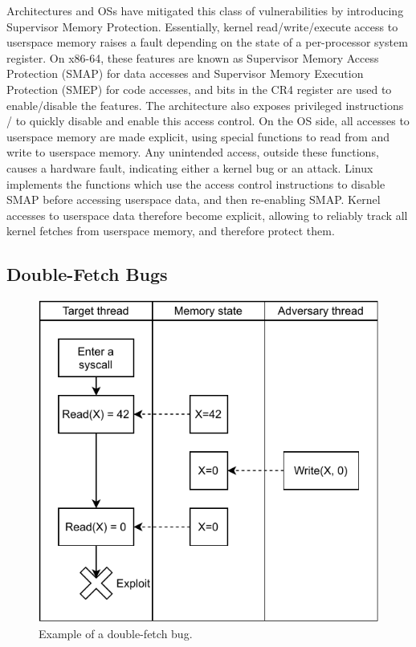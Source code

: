 \documentclass[letterpaper,twocolumn,10pt, anonymous]{article}
\begin{document}
Architectures and OSs have mitigated this class of vulnerabilities
by introducing Supervisor Memory Protection.
Essentially, kernel read/write/execute access to userspace memory
raises a fault depending on the state of a per-processor system 
register.
On x86-64, these features are known as Supervisor Memory Access 
Protection (SMAP) for data accesses and Supervisor Memory Execution 
Protection (SMEP) for code accesses, and bits in the CR4 register 
are used to enable/disable the features.
The architecture also exposes privileged instructions 
/ to quickly disable and enable this access 
control.
On the OS side, all accesses to userspace memory are made explicit, 
using special functions to read from and write to userspace memory.
Any unintended access, outside these functions, causes a 
hardware fault, indicating either a kernel bug or an attack.
Linux implements the functions  which 
use the access control instructions to disable SMAP before 
accessing userspace data, and then re-enabling SMAP.
Kernel accesses to userspace data therefore become explicit, allowing
\tiktok to reliably track all kernel fetches from userspace memory, 
and therefore protect them.


\subsection{Double-Fetch Bugs}

\begin{figure}[]
  \centering
  \includegraphics[width=.8\linewidth]{img/doublefetch.pdf}
  \caption{Example of a double-fetch bug.}
  \label{fig:doublefetch}
\end{figure}
\end{document}
